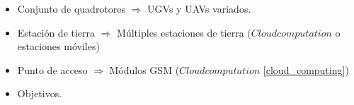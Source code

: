 \begin{itemize}
  \item Conjunto de quadrotores $\Longrightarrow$ UGVs y UAVs variados.
  \item Estaci\'on de tierra $\Longrightarrow$ M\'ultiples estaciones de tierra ($Cloud computation$ \cite{Cloud_computing} o estaciones m\'oviles)
  \item Punto de acceso $\Longrightarrow$  M\'odulos GSM ($Cloud computation$ \ref{cloud_computing})
  \item Objetivos.
\end{itemize}


